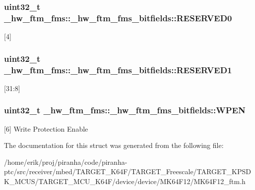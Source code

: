 \subsubsection[{\texorpdfstring{R\+E\+S\+E\+R\+V\+E\+D0}{RESERVED0}}]{\setlength{\rightskip}{0pt plus 5cm}uint32\+\_\+t \+\_\+hw\+\_\+ftm\+\_\+fms\+::\+\_\+hw\+\_\+ftm\+\_\+fms\+\_\+bitfields\+::\+R\+E\+S\+E\+R\+V\+E\+D0}\hypertarget{struct__hw__ftm__fms_1_1__hw__ftm__fms__bitfields_aa372b0ec84f993176c2125dc3b9b6fd7}{}\label{struct__hw__ftm__fms_1_1__hw__ftm__fms__bitfields_aa372b0ec84f993176c2125dc3b9b6fd7}
\mbox{[}4\mbox{]} 
\subsubsection[{\texorpdfstring{R\+E\+S\+E\+R\+V\+E\+D1}{RESERVED1}}]{\setlength{\rightskip}{0pt plus 5cm}uint32\+\_\+t \+\_\+hw\+\_\+ftm\+\_\+fms\+::\+\_\+hw\+\_\+ftm\+\_\+fms\+\_\+bitfields\+::\+R\+E\+S\+E\+R\+V\+E\+D1}\hypertarget{struct__hw__ftm__fms_1_1__hw__ftm__fms__bitfields_a8b47302b8db7f8f5424c4d94580dcaf2}{}\label{struct__hw__ftm__fms_1_1__hw__ftm__fms__bitfields_a8b47302b8db7f8f5424c4d94580dcaf2}
\mbox{[}31\+:8\mbox{]} 
\subsubsection[{\texorpdfstring{W\+P\+EN}{WPEN}}]{\setlength{\rightskip}{0pt plus 5cm}uint32\+\_\+t \+\_\+hw\+\_\+ftm\+\_\+fms\+::\+\_\+hw\+\_\+ftm\+\_\+fms\+\_\+bitfields\+::\+W\+P\+EN}\hypertarget{struct__hw__ftm__fms_1_1__hw__ftm__fms__bitfields_a871d175aac339a23b54cdfd6a83b0371}{}\label{struct__hw__ftm__fms_1_1__hw__ftm__fms__bitfields_a871d175aac339a23b54cdfd6a83b0371}
\mbox{[}6\mbox{]} Write Protection Enable 

The documentation for this struct was generated from the following file\+:\begin{DoxyCompactItemize}
\item 
/home/erik/proj/piranha/code/piranha-\/ptc/src/receiver/mbed/\+T\+A\+R\+G\+E\+T\+\_\+\+K64\+F/\+T\+A\+R\+G\+E\+T\+\_\+\+Freescale/\+T\+A\+R\+G\+E\+T\+\_\+\+K\+P\+S\+D\+K\+\_\+\+M\+C\+U\+S/\+T\+A\+R\+G\+E\+T\+\_\+\+M\+C\+U\+\_\+\+K64\+F/device/device/\+M\+K64\+F12/M\+K64\+F12\+\_\+ftm.\+h\end{DoxyCompactItemize}
